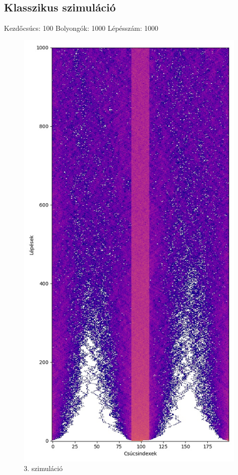 \documentclass[14pt,a4paper]{article}
\begin{document}
\subsection{Klasszikus szimuláció}
Kezdőcsúcs: 100
Bolyongók: 1000
Lépésszám: 1000
\begin{figure}[H]
\centering
\includegraphics[width = 0.7\columnwidth]{sim03.jpg}
\caption{3. szimuláció}
\end{figure}
\end{document}
